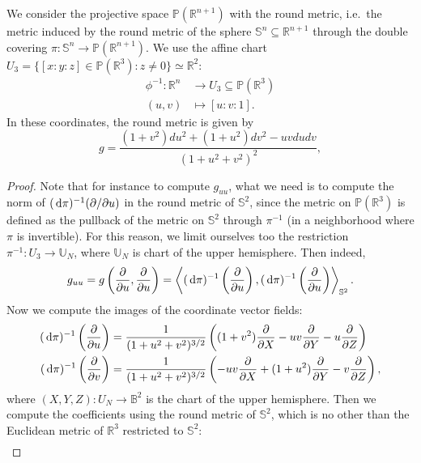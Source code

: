 \documentclass{report}
\begin{document}
\begin{itemize}
    We consider the projective space $\mathbb P(\mathbb R^{n+1})$ with the round metric, i.e.\ the metric induced by the round metric of the sphere $\mathbb S^n \subseteq \mathbb R^{n+1}$ through the double covering $\pi: \mathbb S^n \to \mathbb P(\mathbb R^{n+1})$.
    We use the affine chart $U_3 = \{[x:y:z] \in \mathbb P(\mathbb R^3): z \neq 0\} \simeq \mathbb R^2$:
    \begin{align*}
        \phi^{-1}: \mathbb R^n &\to U_3 \subseteq \mathbb P(\mathbb R^3)\\
        (u,v) &\mapsto [u:v:1].
    \end{align*}
    In these coordinates, the round metric is given by
    \[
    g = \frac{(1 + v^2) du^2 + (1 + u^2) dv^2 - uv du dv}{(1 + u^2 + v^2)^2},
    \]
    \begin{proof}
        Note that for instance to compute $g_{uu}$, what we need is to compute the norm of $(\,\mathrm{d} \pi)^{-1}(\partial/\partial u)$ in the round metric of $\mathbb S^2$, since the metric on $\mathbb P(\mathbb R^3)$ is defined as the pullback of the metric on $\mathbb S^2$ through $\pi^{-1}$ (in a neighborhood where $\pi$ is invertible).
        For this reason, we limit ourselves too the restriction $\pi^{-1}: U_3 \to \mathbb U_N$, where $\mathbb U_N$ is chart of the upper hemisphere.
        Then indeed,
        \[
        g_{uu} = g\left(\frac{\partial}{\partial u}, \frac{\partial}{\partial u}\right) = 
        \left\langle (\,\mathrm{d} \pi)^{-1}\left(\frac{\partial}{\partial u}\right), (\,\mathrm{d} \pi)^{-1}\left(\frac{\partial}{\partial u}\right) \right\rangle_{\mathbb S^2}.
        \]
        Now we compute the images of the coordinate vector fields:
        \begin{align*}
            (\,\mathrm{d} \pi)^{-1}\left(\frac{\partial}{\partial u}\right) &= \frac{1}{(1+ u^2 + v^2)^{3/2}} \left((1 + v^2) \frac{\partial}{\partial X} - uv \frac{\partial}{\partial Y} - u \frac{\partial}{\partial Z}\right)\\
            (\,\mathrm{d} \pi)^{-1}\left(\frac{\partial}{\partial v}\right) &= \frac{1}{(1+ u^2 + v^2)^{3/2}} \left(-uv \frac{\partial}{\partial X} + (1 + u^2) \frac{\partial}{\partial Y} - v \frac{\partial}{\partial Z}\right),
        \end{align*}
        where $(X,Y,Z): U_N \to \mathbb B^2$ is the chart of the upper hemisphere.
        Then we compute the coefficients using the round metric of $\mathbb S^2$, which is no other than the Euclidean metric of $\mathbb R^3$ restricted to $\mathbb S^2$:
    \begin{align*}

\end{align*}
\end{proof}
\end{itemize}
\end{document}
